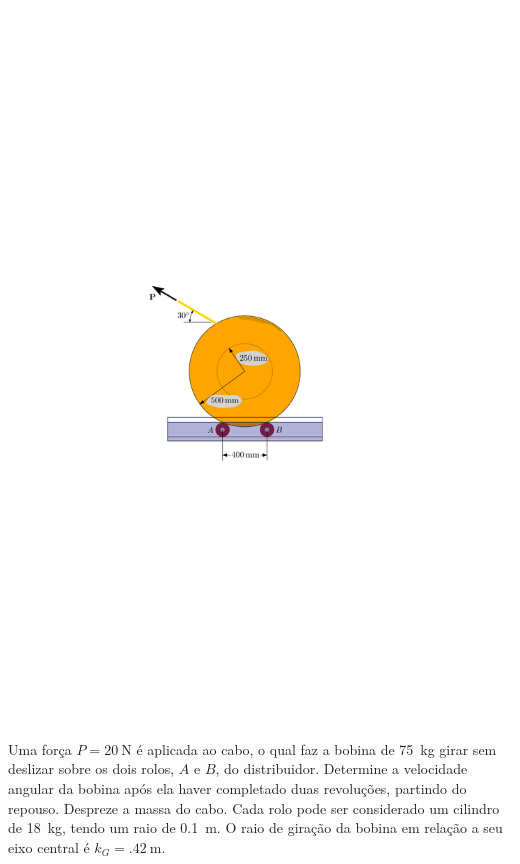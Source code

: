\begin{minipage}{.6\linewidth}
	\begin{flushleft}
		\includegraphics[scale=1.2]{../../images/draw_1_1}
	\end{flushleft}
\end{minipage}
\begin{minipage}{.4\linewidth}
	\item Uma força $P=\SI{20}{\newton}$ é aplicada ao cabo, o qual faz a bobina de \SI{75}{\kilogram} girar sem deslizar sobre os dois rolos, $A$ e $B$, do distribuidor. Determine a velocidade angular da bobina após ela haver completado duas revoluções, partindo do repouso. Despreze a massa do cabo. Cada rolo pode ser considerado um cilindro de \SI{18}{\kilogram}, tendo um raio de \SI{.1}{\meter}. O raio de giração da bobina em relação a seu eixo central é $k_{G}=\SI{.42}{\meter}$.
\end{minipage}